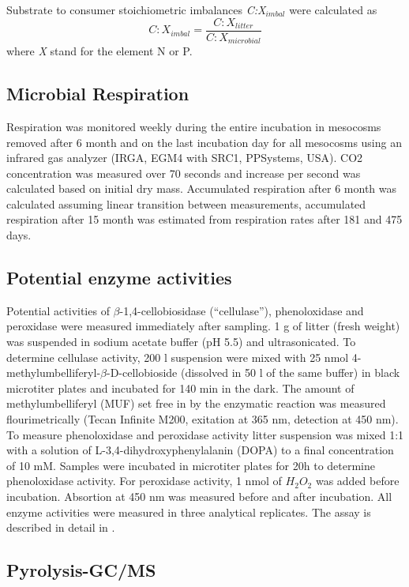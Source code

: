 Substrate to consumer stoichiometric imbalances \emph{C:X$_{imbal}$} were calculated as
\begin{equation}
 C:X_{imbal}=\frac{C:X_{litter}}{C:X_{microbial}} \label{eq:imbal}
\end{equation}
where \emph{X} stand for the element N or P.

\subsection*{Microbial Respiration}
Respiration was monitored weekly during the entire incubation in mesocosms removed after 6 month and on the last incubation day for all mesocosms using an infrared gas analyzer (IRGA, EGM4 with SRC1, PPSystems, USA). CO2 concentration was measured over 70 seconds and increase per second was calculated based on initial dry mass. Accumulated respiration after 6 month was calculated assuming linear transition between measurements, accumulated respiration after 15 month was estimated from respiration rates after 181 and 475 days.

\subsection*{Potential enzyme activities}

Potential activities of $\beta$-1,4-cellobiosidase (``cellulase''), phenoloxidase and peroxidase were measured immediately after sampling. 1 g of litter (fresh weight) was suspended in sodium acetate buffer (pH 5.5) and ultrasonicated. To determine cellulase activity, 200 \textmu l suspension were mixed with 25 nmol 4-methylumbelliferyl-$\beta$-D-cellobioside (dissolved in 50 \textmu l of the same buffer) in black microtiter plates and incubated for 140 min in the dark. The amount of methylumbelliferyl (MUF) set free in by the enzymatic reaction was measured flourimetrically (Tecan Infinite M200, exitation at 365 nm, detection at 450 nm). To measure phenoloxidase and peroxidase activity litter suspension was mixed 1:1 with a solution of L-3,4-dihydroxyphenylalanin (DOPA) to a final concentration of 10 mM. Samples were incubated in microtiter plates for 20h to determine phenoloxidase activity. For peroxidase activity, 1 nmol of $H_2O_2$ was added before incubation. Absortion at 450 nm was measured before and after incubation. All enzyme activities were measured in three analytical replicates. The assay is described in detail in \cite{Kaiser2010b}.

\subsection*{Pyrolysis-GC/MS}

